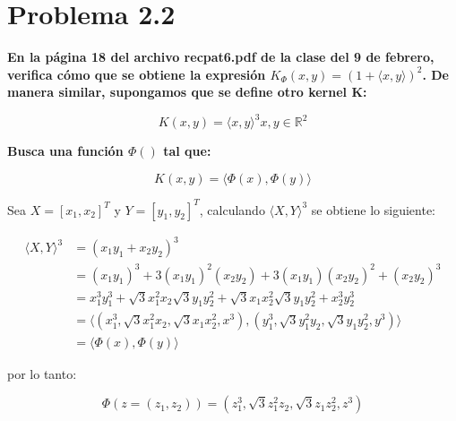 \section*{Problema 2.2}

\textbf{En la página 18 del archivo recpat6.pdf de la clase del 9 de febrero, verifica cómo que se obtiene la expresión $K_\Phi (x, y) = (1 + \langle x, y \rangle)^2$. De manera similar, supongamos que se define otro kernel K:}

\begin{equation*}
    K(x,y) = \langle x,y \rangle^3 x,y \in \mathbb{R}^2
\end{equation*}

\textbf{Busca una función $\Phi()$ tal que:}

\begin{equation*}
    K(x,y) = \langle \Phi(x), \Phi(y) \rangle
\end{equation*}

Sea $X=[x_1,x_2]^T$ y $Y=[y_1,y_2]^T$, calculando $\langle X,Y \rangle^3$ se obtiene lo siguiente:

\begin{align*}
    \langle X,Y \rangle^3 & = (x_1y_1+x_2y_2)^3                                                                                          \\
                          & = (x_1y_1)^3 + 3(x_1y_1)^2(x_2y_2) + 3(x_1y_1)(x_2y_2)^2 + (x_2y_2)^3                                        \\
                          & = x_1^3 y_1^3 + \sqrt{3}x_1^2 x_2 \sqrt{3}y_1y_2^2 + \sqrt{3}x_1x_2^2 \sqrt{3}y_1y_2^2+x_2^3y_2^3            \\
                          & = \langle (x_1^3,\sqrt{3}x_1^2x_2,\sqrt{3}x_1x_2^2,x^3),(y_1^3,\sqrt{3}y_1^2y_2,\sqrt{3}y_1y_2^2,y^3)\rangle \\
                          & =\langle \Phi(x) , \Phi(y) \rangle
\end{align*}

por lo tanto:

\begin{equation*}
    \Phi(z=(z_1,z_2)) = (z_1^3,\sqrt{3}z_1^2z_2,\sqrt{3}z_1z_2^2,z^3)
\end{equation*}